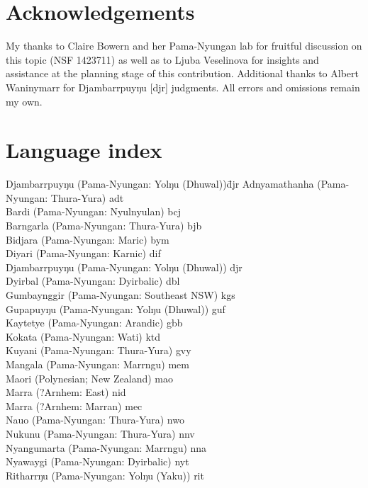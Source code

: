 \documentclass[output=paper,draft,draftmode,colorlinks,citecolor=brown]{langscibook}
\begin{document}
\section*{Acknowledgements} 

My thanks to Claire Bowern and her Pama-Nyungan lab for fruitful discussion on this topic (NSF 1423711) as well as to Ljuba Veselinova for insights and assistance at the planning stage of this contribution. Additional thanks to Albert Waninymarr for Djambarrpuyŋu [djr] judgments. All errors and omissions remain my own.

\section*{Language index}
\noindent
\begin{tabbing}
Djambarrpuyŋu (Pama-Nyungan: Yolŋu (Dhuwal))\quad\=djr\kill
Adnyamathanha (Pama-Nyungan: Thura-Yura) \> adt\\
Bardi (Pama-Nyungan: Nyulnyulan) \> bcj\\
Barngarla (Pama-Nyungan: Thura-Yura) \> bjb\\
Bidjara (Pama-Nyungan: Maric) \> bym\\
Diyari (Pama-Nyungan: Karnic) \> dif\\
Djambarrpuyŋu (Pama-Nyungan: Yolŋu (Dhuwal)) \> djr\\
Dyirbal (Pama-Nyungan: Dyirbalic) \> dbl\\
Gumbaynggir (Pama-Nyungan: Southeast NSW) \> kgs\\
Gupapuyŋu (Pama-Nyungan: Yolŋu (Dhuwal)) \> guf\\
Kaytetye (Pama-Nyungan: Arandic) \> gbb\\
Kokata (Pama-Nyungan: Wati) \> ktd\\
Kuyani (Pama-Nyungan: Thura-Yura) \> gvy\\
Mangala (Pama-Nyungan: Marrngu) \> mem\\
Maori (Polynesian; New Zealand) \> mao\\
Marra (?Arnhem: East) \> nid\\
Marra (?Arnhem: Marran) \> mec\\
Nauo (Pama-Nyungan: Thura-Yura) \> nwo\\
Nukunu (Pama-Nyungan: Thura-Yura) \> nnv\\
Nyangumarta (Pama-Nyungan: Marrngu) \> nna\\
Nyawaygi (Pama-Nyungan: Dyirbalic) \> nyt\\
Ritharrŋu (Pama-Nyungan: Yolŋu (Yaku)) \> rit\\

\end{tabbing}
\end{document}
